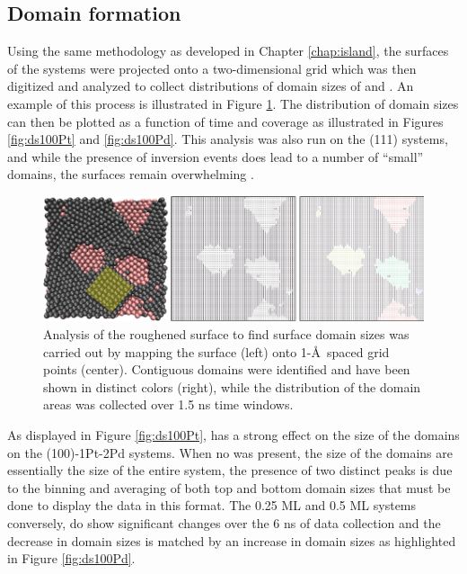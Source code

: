 \subsection{Domain formation}
Using the same methodology as developed in Chapter \ref{chap:island}, the
surfaces of the systems were projected onto a two-dimensional grid which was
then digitized and analyzed to collect distributions of domain sizes of 
and . An example of this process is illustrated in Figure
\ref{fig:surfaceGrid}.  The distribution of domain sizes can then be plotted as
a function of time and  coverage as illustrated in Figures
\ref{fig:ds100Pt} and \ref{fig:ds100Pd}. This analysis was also run on the
(111) systems, and while the presence of inversion events does lead to a number
of ``small''  domains, the surfaces remain overwhelming .

\begin{landscape}
\begin{figure}[p!]
\centering
  \includegraphics[width=\linewidth]{../figures/appD/grid_small.pdf}
  \caption{Analysis of the roughened surface to find surface domain sizes was
carried out by mapping the surface (left) onto 1-\AA\ spaced grid
points (center). Contiguous domains were identified and have been shown in
distinct colors (right), while the distribution of the domain areas was collected
over 1.5 ns time windows.}
\label{fig:surfaceGrid}
\end{figure}
\end{landscape}

As displayed in Figure \ref{fig:ds100Pt},  has a strong effect on the
size of the  domains on the (100)-1Pt-2Pd systems. When no  was
present, the size of the domains are essentially the size of the entire system,
the presence of two distinct peaks is due to the binning and averaging of both
top and bottom domain sizes that must be done to display the data in this
format. The 0.25 ML and 0.5 ML systems conversely, do show significant changes
over the 6 ns of data collection and the decrease in  domain sizes is
matched by an increase in  domain sizes as highlighted in
Figure \ref{fig:ds100Pd}. 

